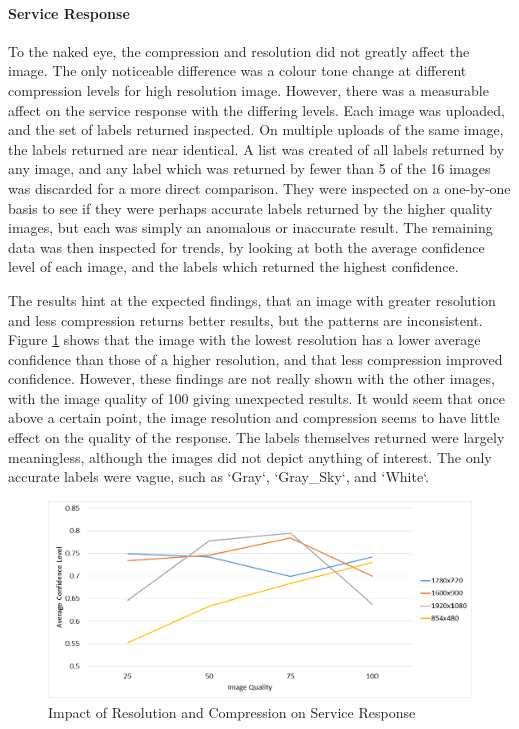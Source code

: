 \documentclass{article}
\begin{document}
\paragraph{Service Response}
To the naked eye, the compression and resolution did not greatly affect the image. The only noticeable difference was a colour tone change at different compression levels for high resolution image. However, there was a measurable affect on the service response with the differing levels. Each image was uploaded, and the set of labels returned inspected. On multiple uploads of the same image, the labels returned are near identical. A list was created of all labels returned by any image, and any label which was returned by fewer than 5 of the 16 images was discarded for a more direct comparison. They were inspected on a one-by-one basis to see if they were perhaps accurate labels returned by the higher quality images, but each was simply an anomalous or inaccurate result. The remaining data was then inspected for trends, by looking at both the average confidence level of each image, and the labels which returned the highest confidence. 

The results hint at the expected findings, that an image with greater resolution and less compression returns better results, but the patterns are inconsistent. Figure \ref{fig:ImageResImpact} shows that the image with the lowest resolution has a lower average confidence than those of a higher resolution, and that less compression improved confidence. However, these findings are not really shown with the other images, with the image quality of 100 giving unexpected results. It would seem that once above a certain point, the image resolution and compression seems to have little effect on the quality of the response. The labels themselves returned were largely meaningless, although the images did not depict anything of interest. The only accurate labels were vague, such as `Gray`, `Gray\_Sky`, and `White`.  

\begin{figure}[h]
\centering
\caption{Impact of Resolution and Compression on Service Response\label{fig:ImageResImpact}}
\includegraphics[width=\textwidth]{ImageResImpact}
\end{figure}
\end{document}
